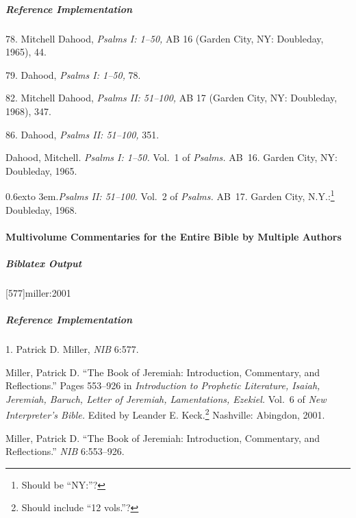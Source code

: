 \documentclass[a4paper]{article}
\newcommand*{\refbibnamedash}{%
  \leavevmode\raise 0.6ex\hbox to 3em{\hrulefill}.\space}
\newenvironment{biboutput}{%
  \subparagraph{Biblatex Output}
}{\color{black}}
\newenvironment{refimp}{%
  \subparagraph{Reference Implementation}
  \color{reference-colour}
  \rm
}{\par\color{black}}
\begin{document}
\begin{refimp}
  \hspace*{\bibindent}78. Mitchell Dahood, \emph{Psalms I: 1–50,} AB 16
  (Garden City, NY: Doubleday, 1965), 44.

  \hspace*{\bibindent}79. Dahood, \emph{Psalms I: 1–50,} 78.

  \hspace*{\bibindent}82. Mitchell Dahood, \emph{Psalms II: 51–100,} AB 17
  (Garden City, NY: Doubleday, 1968), 347.

  \hspace*{\bibindent}86. Dahood, \emph{Psalms II: 51–100,} 351.

  \hangindent\bibindent Dahood, Mitchell. \emph{Psalms I: 1–50.} Vol.~1 of
  \emph{Psalms.} AB~16. Garden City, NY: Doubleday, 1965.

  \hangindent\bibindent\refbibnamedash \emph{Psalms II: 51–100.} Vol.~2 of
  \emph{Psalms.} AB~17. Garden City, N.Y.:\footnote{Should be “NY:”?}
  Doubleday, 1968.

\end{refimp}

\paragraph{Multivolume Commentaries for the Entire Bible by Multiple Authors}

\begin{biboutput}
  [577]{miller:2001}
  \toggletrue{fullbibrefs}
  \togglefalse{fullbibrefs}
\end{biboutput}

\begin{refimp}
  \hspace*{\bibindent}1. Patrick D. Miller, \emph{NIB} 6:577.

  \hangindent\bibindent Miller, Patrick D. “The Book of Jeremiah:
  Introduction, Commentary, and Reflections.” Pages 553–926 in
  \emph{Introduction to Prophetic Literature, Isaiah, Jeremiah, Baruch, Letter
  of Jeremiah, Lamentations, Ezekiel.} Vol.~6 of \emph{New Interpreter’s
  Bible.} Edited by Leander E. Keck.\footnote{Should include “12 vols.”?}
  Nashville: Abingdon, 2001.

  \hangindent\bibindent Miller, Patrick D. “The Book of Jeremiah:
  Introduction, Commentary, and Reflections.” \emph{NIB} 6:553–926.

\end{refimp}
\end{document}
